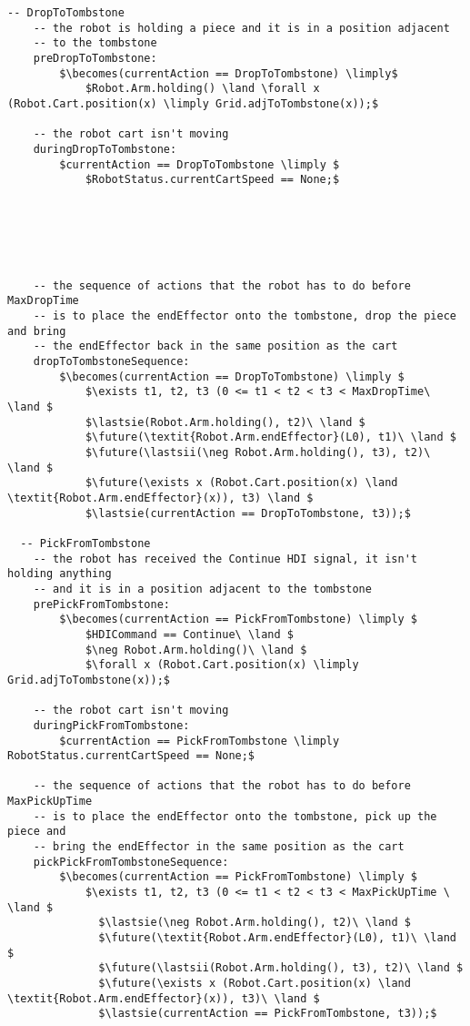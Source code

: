 \begin{lstlisting}[fontadjust, mathescape, frame=single]
  -- DropToTombstone
    -- the robot is holding a piece and it is in a position adjacent 
    -- to the tombstone
    preDropToTombstone:
        $\becomes(currentAction == DropToTombstone) \limply$
            $Robot.Arm.holding() \land \forall x (Robot.Cart.position(x) \limply Grid.adjToTombstone(x));$

    -- the robot cart isn't moving
    duringDropToTombstone:
        $currentAction == DropToTombstone \limply $
            $RobotStatus.currentCartSpeed == None;$






    -- the sequence of actions that the robot has to do before MaxDropTime 
    -- is to place the endEffector onto the tombstone, drop the piece and bring 
    -- the endEffector back in the same position as the cart
    dropToTombstoneSequence:
        $\becomes(currentAction == DropToTombstone) \limply $
            $\exists t1, t2, t3 (0 <= t1 < t2 < t3 < MaxDropTime\ \land $
            $\lastsie(Robot.Arm.holding(), t2)\ \land $
            $\future(\textit{Robot.Arm.endEffector}(L0), t1)\ \land $
            $\future(\lastsii(\neg Robot.Arm.holding(), t3), t2)\ \land $
            $\future(\exists x (Robot.Cart.position(x) \land \textit{Robot.Arm.endEffector}(x)), t3) \land $
            $\lastsie(currentAction == DropToTombstone, t3));$

  -- PickFromTombstone
    -- the robot has received the Continue HDI signal, it isn't holding anything 
    -- and it is in a position adjacent to the tombstone
    prePickFromTombstone:
        $\becomes(currentAction == PickFromTombstone) \limply $
            $HDICommand == Continue\ \land $
            $\neg Robot.Arm.holding()\ \land $
            $\forall x (Robot.Cart.position(x) \limply Grid.adjToTombstone(x));$

    -- the robot cart isn't moving
    duringPickFromTombstone:
        $currentAction == PickFromTombstone \limply RobotStatus.currentCartSpeed == None;$

    -- the sequence of actions that the robot has to do before MaxPickUpTime 
    -- is to place the endEffector onto the tombstone, pick up the piece and 
    -- bring the endEffector in the same position as the cart
    pickPickFromTombstoneSequence:
        $\becomes(currentAction == PickFromTombstone) \limply $
            $\exists t1, t2, t3 (0 <= t1 < t2 < t3 < MaxPickUpTime \ \land $
              $\lastsie(\neg Robot.Arm.holding(), t2)\ \land $
              $\future(\textit{Robot.Arm.endEffector}(L0), t1)\ \land $
              $\future(\lastsii(Robot.Arm.holding(), t3), t2)\ \land $
              $\future(\exists x (Robot.Cart.position(x) \land \textit{Robot.Arm.endEffector}(x)), t3)\ \land $
              $\lastsie(currentAction == PickFromTombstone, t3));$
    

\end{lstlisting}
